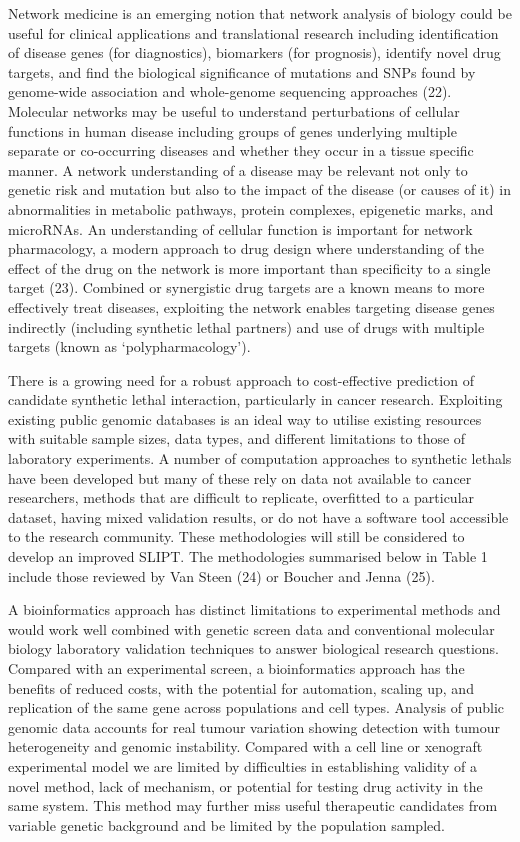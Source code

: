 Network medicine is an emerging notion that network analysis of biology could be useful for clinical applications and translational research including identification of disease genes (for diagnostics), biomarkers (for prognosis), identify novel drug targets, and find the biological significance of \glspl{mutation} and \glspl{SNP} found by \gls{genome}-wide association and whole-genome sequencing approaches (22). Molecular networks may be useful to understand perturbations of cellular functions in human disease including groups of genes underlying multiple separate or co-occurring diseases and whether they occur in a tissue specific manner. A network understanding of a disease may be relevant not only to genetic risk and \gls{mutation} but also to the impact of the disease (or causes of it) in abnormalities in metabolic pathways, protein complexes, epigenetic marks, and \glspl{microRNA}. An understanding of cellular function is important for network pharmacology, a modern approach to drug design where understanding of the effect of the drug on the network is more important than specificity to a single target (23). Combined or synergistic drug targets are a known means to more effectively treat diseases, exploiting the network enables targeting disease genes indirectly (including \gls{synthetic lethal} partners) and use of drugs with multiple targets (known as ‘polypharmacology’). 

There is a growing need for a robust approach to cost-effective prediction of candidate \gls{synthetic lethal} interaction, particularly in cancer research. Exploiting existing public \gls{genomic} databases is an ideal way to utilise existing resources with suitable sample sizes, data types, and different limitations to those of laboratory experiments. A number of computation approaches to \glspl{synthetic lethal} have been developed but many of these rely on data not available to cancer researchers, methods that are difficult to replicate, overfitted to a particular dataset, having mixed validation results, or do not have a software tool accessible to the research community. These methodologies will still be considered to develop an improved \gls{SLIPT}. The methodologies summarised below in Table 1 include those reviewed by Van Steen (24) or Boucher and Jenna (25). 

A \gls{bioinformatics} approach has distinct limitations to experimental methods and would work well combined with genetic screen data and conventional molecular biology laboratory validation techniques to answer biological research questions. Compared with an experimental screen, a \gls{bioinformatics} approach has the benefits of reduced costs, with the potential for automation, scaling up, and replication of the same gene across populations and cell types. Analysis of public \gls{genomic} data accounts for real tumour variation showing detection with tumour heterogeneity and genomic instability. Compared with a cell line or xenograft experimental model we are limited by difficulties in establishing validity of a novel method, lack of mechanism, or potential for testing drug activity in the same system. This method may further miss useful therapeutic candidates from variable genetic background and be limited by the population sampled.


